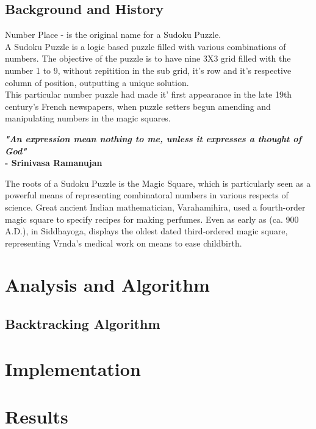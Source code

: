 \documentclass[12pt]{article}
\begin{document}
\subsection{Background and History}
\begin{flushleft}
Number Place - is the original name for a Sudoku Puzzle.\\
A Sudoku Puzzle is a logic based puzzle filled with various combinations of numbers. The objective of the puzzle is to have nine 3X3 grid filled with the number 1 to 9, without repitition in the sub grid, it's row and it's respective column of position, outputting a unique solution. \\
This particular number puzzle had made it' first appearance in the late 19th century's French newspapers, when puzzle setters begun amending and manipulating numbers in the magic squares. 
\end{flushleft}


\begin{center}
\textbf{\textit{"An expression mean nothing to me, unless it expresses a thought of God"} \\ - Srinivasa Ramanujan}
\end{center}


\begin{flushleft}
The roots of a Sudoku Puzzle is the Magic Square, which is particularly seen as a powerful means of representing combinatoral numbers in various respects of science. Great ancient Indian mathematician, Varahamihira, used a fourth-order magic square to specify recipes for making perfumes. Even as early as (ca. 900 A.D.), in Siddhayoga, displays the oldest dated third-ordered magic square, representing Vrnda's medical work on means to ease childbirth.
\end{flushleft}

\section{Analysis and Algorithm}
\subsection{Backtracking Algorithm}
\section{Implementation}
\section{Results}
\end{document}
